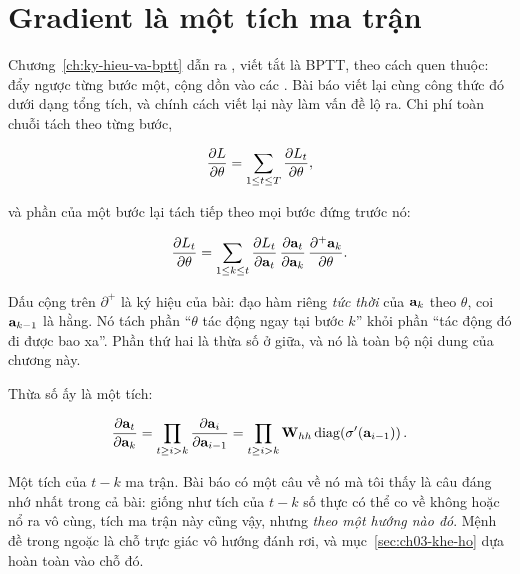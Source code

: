 \section{Gradient là một tích ma trận}
\label{sec:ch03-tich-jacobian}

%
Chương~\ref{ch:ky-hieu-va-bptt} dẫn ra
, viết tắt là
BPTT, theo cách quen thuộc: đẩy ngược
từng bước một, cộng dồn vào các . Bài báo
viết lại cùng công
thức đó dưới dạng tổng tích, và chính cách viết lại này làm vấn đề lộ ra. Chi
phí toàn chuỗi tách theo từng bước,

\begin{equation}
  \frac{\partial L}{\partial \theta} = \sum_{1 \le t \le T} \frac{\partial L_t}{\partial \theta},
  \label{eq:ch03-tach-chi-phi}
\end{equation}

và phần của một bước lại tách tiếp theo mọi bước đứng trước nó:

\begin{equation}
  \frac{\partial L_t}{\partial \theta}
    = \sum_{1 \le k \le t}
      \frac{\partial L_t}{\partial \mathbf{a}_t}\,
      \frac{\partial \mathbf{a}_t}{\partial \mathbf{a}_k}\,
      \frac{\partial^{+} \mathbf{a}_k}{\partial \theta}.
  \label{eq:ch03-tach-theo-buoc}
\end{equation}

Dấu cộng trên \(\partial^{+}\) là ký hiệu của bài: đạo hàm riêng \emph{tức
thời} của \(\mathbf{a}_k\) theo \(\theta\), coi \(\mathbf{a}_{k-1}\) là hằng. Nó
tách phần \enquote{\(\theta\) tác động ngay tại bước \(k\)} khỏi phần
\enquote{tác động đó đi được bao xa}. Phần thứ hai là thừa số ở giữa, và nó là
toàn bộ nội dung của chương này.

Thừa số ấy là một tích:

\begin{equation}
  \frac{\partial \mathbf{a}_t}{\partial \mathbf{a}_k}
    = \prod_{t \ge i > k} \frac{\partial \mathbf{a}_i}{\partial \mathbf{a}_{i-1}}
    = \prod_{t \ge i > k} \mathbf{W}_{hh} \operatorname{diag}\!\left( \sigma'(\mathbf{a}_{i-1}) \right).
  \label{eq:ch03-tich-jacobian}
\end{equation}

%
Một tích của \(t - k\) ma trận. Bài báo có một câu về nó mà tôi thấy là câu
đáng nhớ nhất trong cả bài: giống như tích của \(t-k\) số thực có thể co về
không hoặc nổ ra vô cùng, tích ma trận này cũng vậy, nhưng \emph{theo một hướng
nào đó}. Mệnh đề trong ngoặc là chỗ trực giác vô hướng đánh rơi, và
mục~\ref{sec:ch03-khe-ho} dựa hoàn toàn vào chỗ đó.

